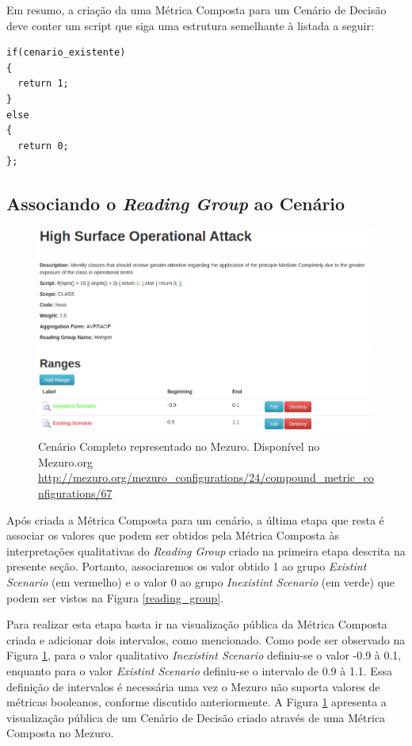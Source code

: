 Em resumo, a criação da uma Métrica Composta para um Cenário de Decisão deve conter um script que siga uma estrutura semelhante à listada a seguir:

\begin{lstlisting}[caption={Estrutura de script básica para Cenários de Decisões}, label=script_example]
if(cenario_existente)
{
  return 1;
}
else
{
  return 0;
};
\end{lstlisting}

\subsection{Associando o \emph{Reading Group} ao Cenário}

\graphicspath{{figuras/}}
\begin{figure}[h]
\centering
\includegraphics[width=1.0\textwidth]{cenario_completo}
\caption{Cenário Completo representado no Mezuro. Disponível no Mezuro.org \url{http://mezuro.org/mezuro_configurations/24/compound_metric_configurations/67}}
\label{cenario_completo}
\end{figure}

Após criada a Métrica Composta para um cenário, a última etapa que resta é associar os valores que podem ser obtidos pela Métrica Composta às interpretações qualitativas do \emph{Reading Group} criado na primeira etapa descrita na presente seção. Portanto, associaremos os valor obtido 1 ao grupo \emph{Existint Scenario} (em vermelho) e o valor 0 ao grupo \emph{Inexistint Scenario} (em verde) que podem ser vistos na Figura \ref{reading_group}.

Para realizar esta etapa basta ir na visualização pública da Métrica Composta criada e adicionar dois intervalos, como mencionado. Como pode ser observado na Figura \ref{cenario_completo}, para o valor qualitativo \emph{Inexistint Scenario} definiu-se o valor -0.9 à 0.1, enquanto para o valor \emph{Existint Scenario} definiu-se o intervalo de 0.9 à 1.1. Essa definição de intervalos é necessária uma vez o Mezuro não suporta valores de métricas booleanos, conforme discutido anteriormente. A Figura \ref{cenario_completo} apresenta a visualização pública de um Cenário de Decisão criado através de uma Métrica Composta no Mezuro.

